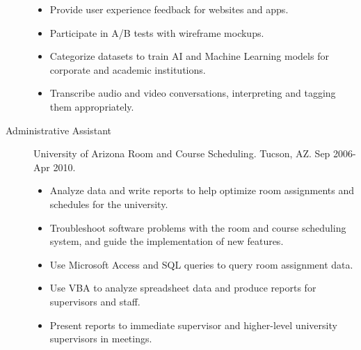 \documentclass{article}
\begin{document}
\begin{description}
\begin{itemize}
    \item Provide user experience feedback for websites and apps.
    \item Participate in A/B tests with wireframe mockups.
    \item Categorize datasets to train AI and Machine Learning models for corporate and academic institutions.
    \item Transcribe audio and video conversations, interpreting and tagging them appropriately.
  \end{itemize}  
  \item[Administrative Assistant] University of Arizona Room and Course Scheduling. Tucson, AZ. Sep 2006-Apr 2010.
  \begin{itemize}
    \item Analyze data and write reports to help optimize room assignments and schedules for the university.
    \item Troubleshoot software problems with the room and course scheduling system, and guide the implementation of new features.
    \item Use Microsoft Access and SQL queries to query room assignment data.
    \item Use VBA to analyze spreadsheet data and produce reports for supervisors and staff.
    \item Present reports to immediate supervisor and higher-level university supervisors in meetings.
  \end{itemize}
\end{description}

\pagebreak

\vspace{-1em}
\end{document}
